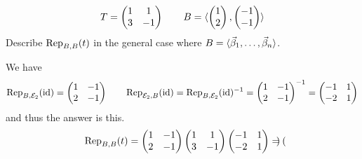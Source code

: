 \begin{exercises}
\begin{exparts}
        \begin{equation*}
          T=\begin{pmatrix}
            1  &1  \\
            3  &-1
          \end{pmatrix}
          \qquad
          B=\sequence{\colvec{1  \\ 2},
                      \colvec{-1 \\ -1}}
        \end{equation*}
      \partsitem Describe $\rep{t}{B,B}$ in the general case where
        \( B=\basis{\beta}{n} \).
    \end{exparts}
    \begin{answer}
      \begin{exparts}
        \partsitem We have
          \begin{equation*}
            \rep{\identity}{B,\stdbasis_2}=
            \begin{pmatrix}
              1  &-1  \\
              2  &-1
            \end{pmatrix}
            \qquad
            \rep{\identity}{\stdbasis_2,B}=\rep{\identity}{B,\stdbasis_2}^{-1}=
            \begin{pmatrix}
              1  &-1  \\
              2  &-1
            \end{pmatrix}^{-1}
            =\begin{pmatrix}
              -1  &1  \\
              -2  &1 
            \end{pmatrix}
          \end{equation*}
          and thus the answer is this.
          \begin{equation*}
            \rep{t}{B,B}
            =
            \begin{pmatrix}
              1  &-1  \\
              2  &-1
            \end{pmatrix}
            \begin{pmatrix}
              1  &1  \\
              3  &-1   
            \end{pmatrix}
            \begin{pmatrix}
              -1  &1  \\
              -2  &1 
            \end{pmatrix}
            =\begin{pmatrix}

\end{pmatrix}
\end{equation*}
\end{exparts}
\end{answer}
\end{exercises}
